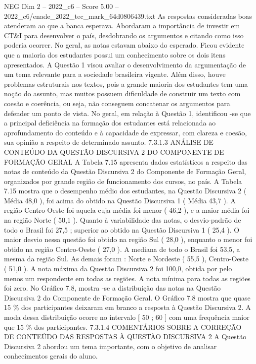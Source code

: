 \begin{textsample}{NEG Dim 2 – 2022\_c6 – Score 5.00 – 2022\_c6/enade\_2022\_tec\_mark\_64d0806439.txt}
As respostas consideradas boas atenderam ao que a banca esperava.
Abordaram a importância de investir em CT\&I para desenvolver o país, desdobrando os argumentos e citando como isso poderia ocorrer.
No geral, as notas estavam abaixo do esperado.
Ficou evidente que a maioria dos estudantes possui um conhecimento sobre os dois itens apresentados.
A Questão 1 visou avaliar o desenvolvimento da argumentação de um tema relevante para a sociedade brasileira vigente.
Além disso, houve problemas estruturais nos textos, pois a grande maioria dos estudantes tem uma noção do assunto, mas muitos possuem dificuldade de construir um texto com coesão e coerência, ou seja, não conseguem concatenar os argumentos para defender um ponto de vista.
No geral, em relação à Questão 1, identificou -se que a principal deficiência na formação dos estudantes está relacionada ao aprofundamento do conteúdo e à capacidade de expressar, com clareza e coesão, sua opinião a respeito de determinado assunto. 7.3.1.3 ANÁLISE DE CONTEÚDO DA QUESTÃO DISCURSIVA 2 DO COMPONENTE DE FORMAÇÃO GERAL A Tabela 7.15 apresenta dados estatísticos a respeito das notas de conteúdo da Questão Discursiva 2 do Componente de Formação Geral, organizados por grande região de funcionamento dos cursos, no país.
A Tabela 7.15 mostra que o desempenho médio dos estudantes, na Questão Discursiva 2 ( Média 48,0 ), foi acima do obtido na Questão Discursiva 1 ( Média 43,7 ).
A região Centro-Oeste foi aquela cuja média foi menor ( 46,2 ), e a maior média foi na região Norte ( 50,1 ).
Quanto à variabilidade das notas, o desvio-padrão de todo o Brasil foi 27,5 ; superior ao obtido na Questão Discursiva 1 ( 25,4 ).
O maior desvio nessa questão foi obtido na região Sul ( 28,0 ), enquanto o menor foi obtido na região Centro-Oeste ( 27,0 ).
A mediana de todo o Brasil foi 53,5, a mesma da região Sul.
As demais foram : Norte e Nordeste ( 55,5 ), Centro-Oeste ( 51,0 ).
A nota máxima da Questão Discursiva 2 foi 100,0, obtida por pelo menos um respondente em todas as regiões.
A nota mínima para todas as regiões foi zero.
No Gráfico 7.8, mostra -se a distribuição das notas na Questão Discursiva 2 do Componente de Formação Geral.
O Gráfico 7.8 mostra que quase 15 \% dos participantes deixaram em branco a resposta à Questão Discursiva 2.
A moda dessa distribuição ocorre no intervalo [ 50 ; 60 ] com uma frequência maior que 15 \% dos participantes. 7.3.1.4 COMENTÁRIOS SOBRE A CORREÇÃO DE CONTEÚDO DAS RESPOSTAS À QUESTÃO DISCURSIVA 2 A Questão Discursiva 2 abordou um tema importante, com o objetivo de analisar conhecimentos gerais do aluno.

\end{textsample}
